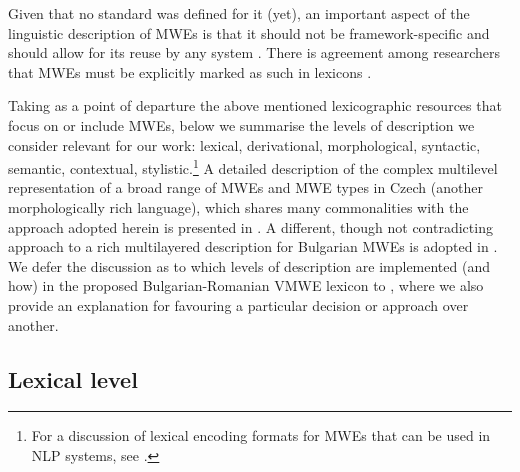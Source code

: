 \documentclass[output=paper,colorlinks,citecolor=brown]{langscibook}
\begin{document}

Given that no standard was defined for it (yet), an important aspect of the linguistic description of MWEs is that it should not be framework-specific and should allow for its reuse by any system \citep{Odijk2013}. There is agreement among researchers that MWEs must be explicitly marked as such in lexicons \citep{fellbaum2005,ECD,al-hajetal2013,dyvik2019,hnatkova-etal-2019,markantonatou-etal-2019-idion,markantonatou-etal-in-prep}.

Taking as a point of departure the above mentioned lexicographic resources that focus on or include MWEs, below we summarise the levels of description we consider relevant for our work: lexical, derivational, morphological, syntactic, semantic, contextual, stylistic.\footnote{For a discussion of lexical encoding formats for MWEs that can be used in NLP systems, see \citet{lichte-etal}.} A detailed description of the complex multilevel representation of a broad range of MWEs and MWE types in Czech (another morphologically rich language), which shares many commonalities with the approach adopted herein is presented in . A different, though not contradicting approach to a rich multilayered description for Bulgarian MWEs is adopted in .
We defer the discussion as to which levels of description are implemented (and how) in the proposed Bulgarian-Romanian VMWE lexicon to , where we also provide an explanation for favouring a particular decision or approach over another.

\subsection{Lexical level} 
\end{document}
